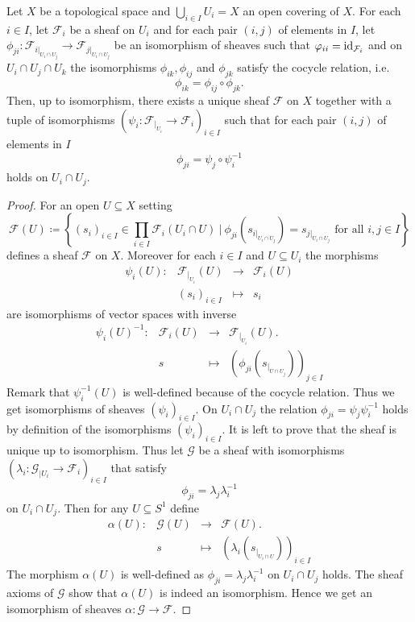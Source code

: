 \begin{prop}\label{gluedsheaf}
    Let $X$ be a topological space and $\bigcup_{i\in I} U_i = X$ an open covering of $X$. For each $i \in I$, let $\mathcal{F}_i$ be a sheaf on ${U_i}$ and for each pair $(i,j)$ of elements in $I$, let $\phi_{ji}: \mathcal{F}_{i\vert_{U_i\cap U_j}} \to \mathcal{F}_{j\vert_{U_i \cap U_j}}$ be an isomorphism of sheaves such that $\varphi_{ii} = \operatorname{id}_{\mathcal{F}_i}$ and on $U_i \cap U_j \cap U_k$ the isomorphisms $\phi_{ik},\phi_{ij}$ and $\phi_{jk}$ satisfy the cocycle relation, i.e.\
    \[
    \phi_{ik} = \phi_{ij} \circ \phi_{jk}.
    \]
    Then, up to isomorphism, there exists a unique sheaf $\mathcal{F}$ on $X$ together with a tuple of isomorphisms $(\psi_i: \mathcal{F}_{\vert_{U_i}} \to \mathcal{F}_i )_{i \in I}$ such that for each pair $(i,j)$ of elements in $I$ \[\phi_{ji} = \psi_j \circ \psi_i^{-1}\] holds on $U_i \cap U_j$.
\end{prop}
\begin{proof} For an open $U \subseteq X$ setting
    \[
    \mathcal{F}(U) \coloneqq \left\{ (s_i)_{i \in I} \in \prod_{i \in I} \mathcal{F}_i(U_i \cap U) ~\Big\vert~ \phi_{ji}\left(s_{i\vert_{U_i \cap U_j}}\right) = s_{j\vert_{U_i \cap U_j}} \text{ for all } i,j \in I \right\}
    \]
    defines a sheaf $\mathcal{F}$ on $X$. Moreover for each $i \in I$ and $U \subseteq U_i$ the morphisms
    \[
    \begin{matrix}
    \psi_i(U) : &\mathcal{F}_{\vert_{U_i}}(U) &\longrightarrow &\mathcal{F}_i(U) \\
    &(s_i)_{i \in I} & \longmapsto & s_i
    \end{matrix}
    \]
    are isomorphisms of vector spaces with inverse
    \[
    \begin{matrix}
    \psi_i(U)^{-1} : &\mathcal{F}_i(U) &\longrightarrow &\mathcal{F}_{\vert_{U_i}}(U). \\
    &s & \longmapsto & (\phi_{ji}(s_{\vert_{U \cap U_j}}))_{j \in I}
    \end{matrix}
    \]
    Remark that $\psi_i^{-1}(U)$ is well-defined because of the cocycle relation. Thus we get isomorphisms of sheaves $(\psi_i)_{i \in I}$. On $U_i \cap U_j$ the relation $\phi_{ji} = \psi_j \psi_i^{-1}$ holds by definition of the isomorphisms $(\psi_i)_{i \in I}$. It is left to prove that the sheaf is unique up to isomorphism. Thus let $\mathcal{G}$ be a sheaf with isomorphisms $(\lambda_i : \mathcal{G}_{\vert U_i} \to \mathcal{F}_i)_{i \in I}$ that satisfy 
    \[
        \phi_{ji} = \lambda_j \lambda_i^{-1}
    \]
    on $U_i \cap U_j$. Then for any $U \subseteq S^1$ define
    \[
    \begin{matrix}
    \alpha(U): &\mathcal{G}(U) &\to &\mathcal{F}(U). \\ 
    & s & \mapsto & (\lambda_{i}(s_{\vert_{U_i\cap U}}))_{i \in I}
    \end{matrix}
    \]
    The morphism $\alpha(U)$ is well-defined as $\phi_{ji} = \lambda_j \lambda_i^{-1}$ on $U_i \cap U_j$ holds. The sheaf axioms of $\mathcal{G}$ show that $\alpha(U)$ is indeed an isomorphism. Hence we get an isomorphism of sheaves $\alpha: \mathcal{G}\to \mathcal{F}$.
\end{proof}


